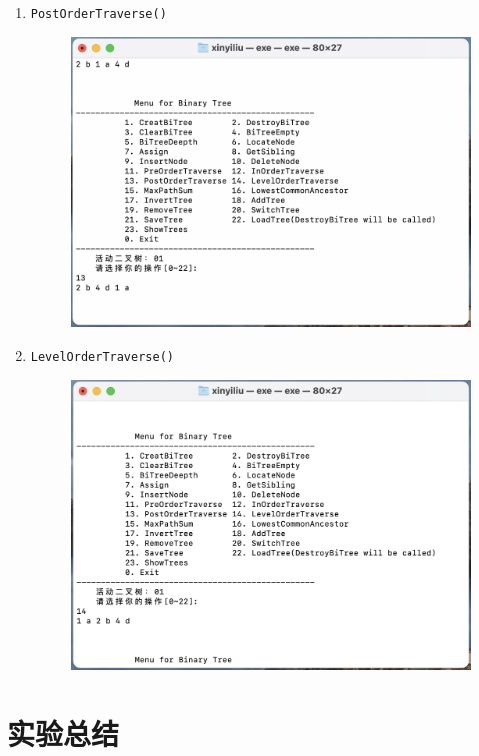 \documentclass[supercite]{Experimental_Report}
\theoremstyle{definition}
\begin{document}
\begin{enumerate}
	\item \verb|PostOrderTraverse()|
		\begin{figure}[!htb]
			\includegraphics[width=0.8\linewidth]{images/img02/截屏2023-06-04 21.15.22.png}
		\end{figure}
		\FloatBarrier
	\newpage
	\item \verb|LevelOrderTraverse()|
		\begin{figure}[!htb]
			\includegraphics[width=0.8\linewidth]{images/img02/截屏2023-06-04 21.15.30.png}
		\end{figure}
	\FloatBarrier
	\newpage
\end{enumerate}
\newpage
\section{实验总结}
\end{document}
